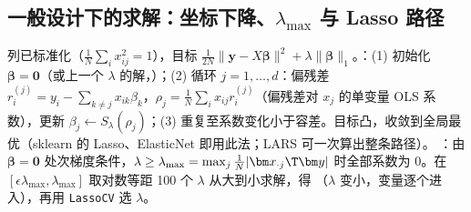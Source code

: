 \subsection{\texorpdfstring{一般设计下的求解：坐标下降、$\lambda_{\max}$ 与 Lasso 路径}{一般设计下的求解：坐标下降、lambda-max 与 Lasso 路径}}
列已标准化（$\frac1N\sum_ix_{ij}^2=1$），目标 $\frac1{2N}\|\bm y-X\bm\beta\|^2+\lambda\|\bm\beta\|_1$。：(1) 初始化 $\bm\beta=\bm 0$（或上一个 $\lambda$ 的解，）；(2) 循环 $j=1,\dots,d$：偏残差 $r_i^{(j)}=y_i-\sum_{k\ne j}x_{ik}\beta_k$，$\rho_j=\frac1N\sum_ix_{ij}r_i^{(j)}$（偏残差对 $x_j$ 的单变量 OLS 系数），更新 $\beta_j\leftarrow S_\lambda(\rho_j)$；(3) 重复至系数变化小于容差。目标凸，收敛到全局最优（sklearn 的 Lasso、ElasticNet 即用此法；LARS 可一次算出整条路径）。
\key{$\lambda_{\max}$}：由 $\bm\beta=\bm0$ 处次梯度条件，$\lambda\ge\lambda_{\max}=\max_j\frac1N|\bm x_{\cdot j}\T\bm y|$ 时全部系数为 0。在 $[\epsilon\lambda_{\max},\lambda_{\max}]$ 取对数等距 100 个 $\lambda$ 从大到小求解，得 （$\lambda$ 变小，变量逐个进入），再用 \texttt{LassoCV} 选 $\lambda$。

